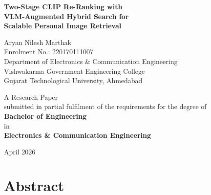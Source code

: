 \documentclass[12pt,a4paper,oneside]{report}
\begin{document}

\begin{titlepage}
\thispagestyle{empty}
\begin{center}
\begin{singlespace}

\vspace*{3cm}

{\LARGE\textbf{Two-Stage CLIP Re-Ranking with\\[6pt]
VLM-Augmented Hybrid Search for\\[6pt]
Scalable Personal Image Retrieval}}

\vspace{2.5cm}

{\large Aryan Nilesh Marthak}\\[8pt]
Enrolment No.: 220170111007\\[8pt]
Department of Electronics \& Communication Engineering\\[8pt]
Vishwakarma Government Engineering College\\[8pt]
Gujarat Technological University, Ahmedabad

\vspace{2.5cm}

A Research Paper\\[8pt]
submitted in partial fulfilment of the requirements for the degree of\\[8pt]
\textbf{Bachelor of Engineering}\\[8pt]
in\\[8pt]
\textbf{Electronics \& Communication Engineering}

\vspace{2cm}

April 2026

\end{singlespace}
\end{center}
\end{titlepage}

\clearpage
\chapter*{Abstract}
\end{document}
